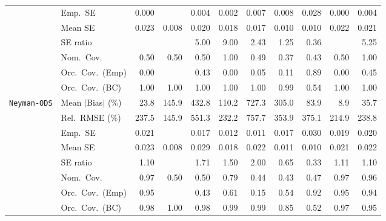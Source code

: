 \begin{landscape}
\begin{longtable}{llrrrrrrrrr}
 & Emp.\ SE & 0.000 &  & 0.004 & 0.002 & 0.007 & 0.008 & 0.028 & 0.000 & 0.004 \\
 & Mean SE & 0.023 & 0.008 & 0.020 & 0.018 & 0.017 & 0.010 & 0.010 & 0.022 & 0.021 \\
 & SE ratio &  &  & 5.00 & 9.00 & \cellcolor{rankthree}2.43 & \cellcolor{rankone}1.25 & \cellcolor{ranktwo}0.36 &  & 5.25 \\
 & Nom.\ Cov. & \cellcolor{ranktwo}0.50 & \cellcolor{ranktwo}0.50 & \cellcolor{ranktwo}0.50 & \cellcolor{rankone}1.00 & \cellcolor{rankthree}0.49 & 0.37 & 0.43 & \cellcolor{ranktwo}0.50 & \cellcolor{rankone}1.00 \\
 & Orc.\ Cov.\ (Emp) & 0.00 &  & \cellcolor{rankthree}0.43 & 0.00 & 0.05 & 0.11 & \cellcolor{rankone}0.89 & 0.00 & \cellcolor{ranktwo}0.45 \\
 & Orc.\ Cov.\ (BC) & \cellcolor{ranktwo}1.00 & \cellcolor{ranktwo}1.00 & \cellcolor{ranktwo}1.00 & \cellcolor{ranktwo}1.00 & \cellcolor{ranktwo}1.00 & \cellcolor{rankone}0.99 & \cellcolor{rankthree}0.54 & \cellcolor{ranktwo}1.00 & \cellcolor{ranktwo}1.00 \\
\addlinespace[2pt]
\quad \texttt{Neyman-ODS} & Mean $|$Bias$|$ (\%) & \cellcolor{ranktwo}23.8 & 145.9 & 432.8 & 110.2 & 727.3 & 305.0 & 83.9 & \cellcolor{rankone}8.9 & \cellcolor{rankthree}35.7 \\
 & Rel.\ RMSE (\%) & 237.5 & \cellcolor{rankone}145.9 & 551.3 & \cellcolor{rankthree}232.2 & 757.7 & 353.9 & 375.1 & \cellcolor{ranktwo}214.9 & 238.8 \\
 & Emp.\ SE & 0.021 &  & 0.017 & 0.012 & 0.011 & 0.017 & 0.030 & 0.019 & 0.020 \\
 & Mean SE & 0.023 & 0.008 & 0.029 & 0.018 & 0.022 & 0.011 & 0.010 & 0.021 & 0.022 \\
 & SE ratio & \cellcolor{rankone}1.10 &  & 1.71 & 1.50 & 2.00 & \cellcolor{rankthree}0.65 & 0.33 & \cellcolor{ranktwo}1.11 & \cellcolor{rankone}1.10 \\
 & Nom.\ Cov. & \cellcolor{ranktwo}0.97 & 0.50 & 0.50 & \cellcolor{rankthree}0.79 & 0.44 & 0.43 & 0.47 & \cellcolor{ranktwo}0.97 & \cellcolor{rankone}0.96 \\
 & Orc.\ Cov.\ (Emp) & \cellcolor{rankone}0.95 &  & 0.43 & 0.61 & 0.15 & 0.54 & \cellcolor{rankthree}0.92 & \cellcolor{rankone}0.95 & \cellcolor{ranktwo}0.94 \\
 & Orc.\ Cov.\ (BC) & \cellcolor{rankthree}0.98 & 1.00 & \cellcolor{rankthree}0.98 & 0.99 & 0.99 & 0.85 & 0.52 & \cellcolor{ranktwo}0.97 & \cellcolor{rankone}0.95 \\

\end{longtable}
\end{landscape}
